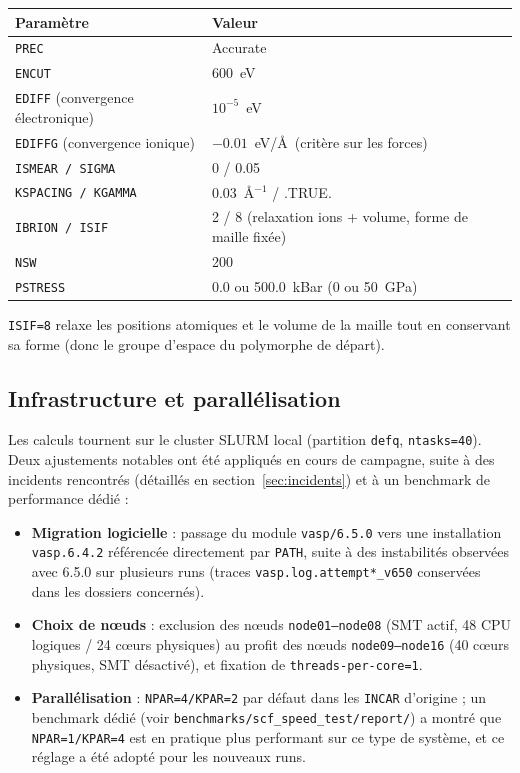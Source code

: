 \documentclass[11pt,a4paper]{article}
\begin{document}
\begin{center}
\begin{tabular}{ll}
\toprule
Paramètre & Valeur \\
\midrule
\texttt{PREC} & Accurate \\
\texttt{ENCUT} & 600~eV \\
\texttt{EDIFF} (convergence électronique) & $10^{-5}$~eV \\
\texttt{EDIFFG} (convergence ionique) & $-0.01$~eV/\AA\ (critère sur les forces) \\
\texttt{ISMEAR / SIGMA} & 0 / 0.05 \\
\texttt{KSPACING / KGAMMA} & 0.03~\AA$^{-1}$ / .TRUE. \\
\texttt{IBRION / ISIF} & 2 / 8 (relaxation ions + volume, forme de maille fixée) \\
\texttt{NSW} & 200 \\
\texttt{PSTRESS} & 0.0 ou 500.0~kBar (0 ou 50~GPa) \\
\bottomrule
\end{tabular}
\end{center}

\texttt{ISIF=8} relaxe les positions atomiques et le volume de la maille tout en conservant sa
forme (donc le groupe d'espace du polymorphe de départ).

\subsection{Infrastructure et parallélisation}

Les calculs tournent sur le cluster SLURM local (partition \texttt{defq}, \texttt{ntasks=40}).
Deux ajustements notables ont été appliqués en cours de campagne, suite à des incidents
rencontrés (détaillés en section~\ref{sec:incidents}) et à un benchmark de performance dédié :

\begin{itemize}
  \item \textbf{Migration logicielle} : passage du module \texttt{vasp/6.5.0} vers une
  installation \texttt{vasp.6.4.2} référencée directement par \texttt{PATH}, suite à des
  instabilités observées avec 6.5.0 sur plusieurs runs (traces
  \texttt{vasp.log.attempt*\_v650} conservées dans les dossiers concernés).
  \item \textbf{Choix de nœuds} : exclusion des nœuds \texttt{node01--node08} (SMT actif,
  48 CPU logiques / 24 cœurs physiques) au profit des nœuds \texttt{node09--node16}
  (40 cœurs physiques, SMT désactivé), et fixation de \texttt{threads-per-core=1}.
  \item \textbf{Parallélisation} : \texttt{NPAR=4/KPAR=2} par défaut dans les \texttt{INCAR}
  d'origine ; un benchmark dédié (voir \texttt{benchmarks/scf\_speed\_test/report/}) a montré
  que \texttt{NPAR=1/KPAR=4} est en pratique plus performant sur ce type de système, et ce
  réglage a été adopté pour les nouveaux runs.
\end{itemize}
\end{document}
